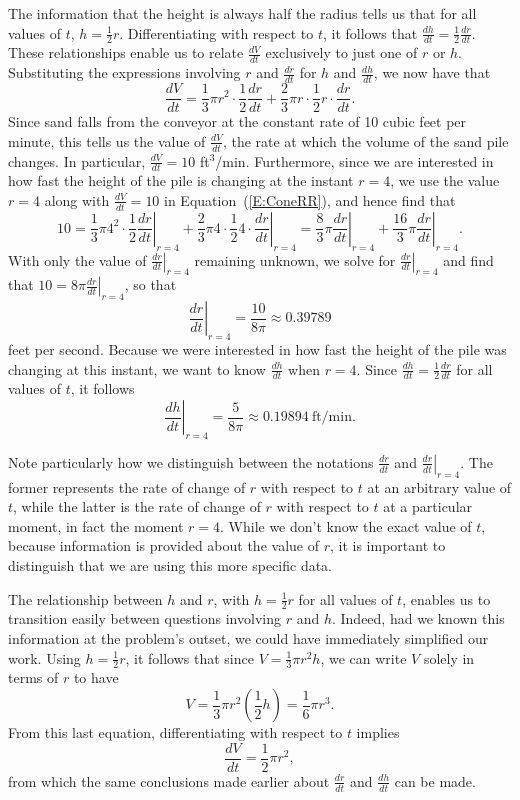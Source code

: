 The information that the height is always half the radius tells us that for all values of $t$, $h = \frac{1}{2}r$.  Differentiating with respect to $t$, it follows that $\frac{dh}{dt} = \frac{1}{2} \frac{dr}{dt}$.  These relationships enable us to relate $\frac{dV}{dt}$ exclusively to just one of $r$ or $h$.  Substituting the expressions involving $r$ and $\frac{dr}{dt}$ for $h$ and $\frac{dh}{dt}$, we now have that 
\begin{equation} \label{E:ConeRR}
\frac{dV}{dt} = \frac{1}{3} \pi r^2 \cdot \frac{1}{2} \frac{dr}{dt} + \frac{2}{3} \pi r \cdot \frac{1}{2}r \cdot \frac{dr}{dt}.
\end{equation}
Since sand falls from the conveyor at the constant rate of 10 cubic feet per minute, this tells us the value of $\frac{dV}{dt}$, the rate at which the volume of the sand pile changes.  In particular, $\frac{dV}{dt} = 10$ ft$^3$/min.  Furthermore, since we are interested in how fast the height of the pile is changing at the instant $r = 4$, we use the value $r = 4$ along with $\frac{dV}{dt} = 10$ in Equation~(\ref{E:ConeRR}), and hence find that
$$10 = \frac{1}{3} \pi 4^2 \cdot \frac{1}{2}  \left. \frac{dr}{dt} \right|_{r=4} + \frac{2}{3} \pi 4 \cdot \frac{1}{2}4 \cdot \left. \frac{dr}{dt} \right|_{r=4} = \frac{8}{3}\pi \left. \frac{dr}{dt} \right|_{r=4} + \frac{16}{3} \pi \left. \frac{dr}{dt} \right|_{r=4}.$$
With only the value of $\left. \frac{dr}{dt} \right|_{r=4}$ remaining unknown, we solve for $\left. \frac{dr}{dt} \right|_{r=4}$ and find that $10 = 8 \pi \left. \frac{dr}{dt} \right|_{r=4}$, so that
$$\left. \frac{dr}{dt} \right|_{r=4} = \frac{10}{8\pi} \approx 0.39789$$
feet per second.  Because we were interested in how fast the height of the pile was changing at this instant, we want to know $\frac{dh}{dt}$ when $r = 4$.  Since $\frac{dh}{dt} = \frac{1}{2} \frac{dr}{dt}$ for all values of $t$, it follows 
$$\left. \frac{dh}{dt} \right|_{r=4} = \frac{5}{8\pi} \approx 0.19894 \ \mbox{ft/min}.$$

Note particularly how we distinguish between the notations $\frac{dr}{dt}$ and $\left. \frac{dr}{dt} \right|_{r=4}$.  The former represents the rate of change of $r$ with respect to $t$ at an arbitrary value of $t$, while the latter is the rate of change of $r$ with respect to $t$ at a particular moment, in fact the moment $r = 4$.  While we don't know the exact value of $t$, because information is provided about the value of $r$, it is important to distinguish that we are using this more specific data.

The relationship between $h$ and $r$, with $h = \frac{1}{2}r$ for all values of $t$, enables us to transition easily between questions involving $r$ and $h$.  Indeed, had we known this information at the problem's outset, we could have immediately simplified our work.  Using $h = \frac{1}{2}r$, it follows that since $V = \frac{1}{3} \pi r^2 h$, we can write $V$ solely in terms of $r$ to have
$$V = \frac{1}{3} \pi r^2 \left(\frac{1}{2}h\right) = \frac{1}{6} \pi r^3.$$
From this last equation, differentiating with respect to $t$ implies
$$\frac{dV}{dt} = \frac{1}{2} \pi r^2,$$
from which the same conclusions made earlier about $\frac{dr}{dt}$ and $\frac{dh}{dt}$ can be made.

